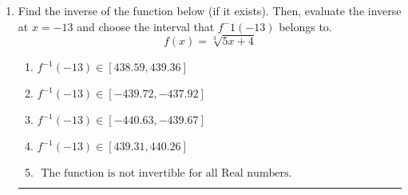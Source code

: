 \documentclass[14pt]{extbook}
\newcommand{\litem}[1]{\item#1\hspace*{-1cm}\rule{\textwidth}{0.4pt}}
\begin{document}
\begin{enumerate}
{\begin{enumerate}[label=\Alph*.]
\end{enumerate} }
\litem{
Find the inverse of the function below (if it exists). Then, evaluate the inverse at $x = -13$ and choose the interval that $f^-1(-13)$ belongs to.\[ f(x) = \sqrt[3]{5 x + 4} \]\begin{enumerate}[label=\Alph*.]
\item \( f^{-1}(-13) \in [438.59, 439.36] \)
\item \( f^{-1}(-13) \in [-439.72, -437.92] \)
\item \( f^{-1}(-13) \in [-440.63, -439.67] \)
\item \( f^{-1}(-13) \in [439.31, 440.26] \)
\item \( \text{ The function is not invertible for all Real numbers. } \)

\end{enumerate} }
\end{enumerate}
\end{document}
